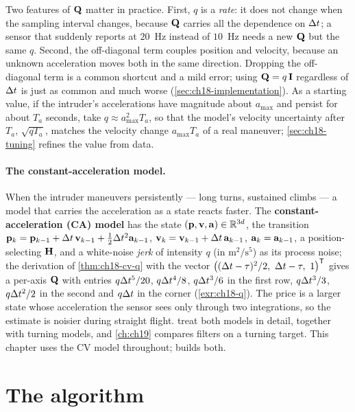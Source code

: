 Two features of $\mathbf{Q}$ matter in practice. First, $q$ is a \emph{rate}: it
does not change when the sampling interval changes, because $\mathbf{Q}$ carries
all the dependence on $\Delta t$; a sensor that suddenly reports at $20$~Hz
instead of $10$~Hz needs a new $\mathbf{Q}$ but the same $q$. Second, the
off-diagonal term couples position and velocity, because an unknown
acceleration moves both in the same direction. Dropping the off-diagonal
term is a common shortcut and a mild error; using $\mathbf{Q}=q\,\mathbf{I}$
regardless of $\Delta t$ is just as common and much worse
(\cref{sec:ch18-implementation}). As a
starting value, if the intruder's accelerations have magnitude about
$a_{\max}$ and persist for about $T_a$ seconds, take $q\approx a_{\max}^2T_a$,
so that the model's velocity uncertainty after $T_a$, $\sqrt{qT_a}$, matches
the velocity change $a_{\max}T_a$ of a real maneuver; \cref{sec:ch18-tuning}
refines the value from data.

\paragraph{The constant-acceleration model.}
When the intruder maneuvers persistently --- long turns, sustained climbs
--- a model that carries the acceleration as a state reacts faster. The
\textbf{constant-acceleration (CA) model}
has the state $(\mathbf{p},\mathbf{v},\mathbf{a})\in\mathbb{R}^{3d}$, the transition
$\mathbf{p}_k=\mathbf{p}_{k-1}+\Delta t\,\mathbf{v}_{k-1}+\tfrac12\Delta t^2\mathbf{a}_{k-1}$,
$\mathbf{v}_k=\mathbf{v}_{k-1}+\Delta t\,\mathbf{a}_{k-1}$, $\mathbf{a}_k=\mathbf{a}_{k-1}$, a
position-selecting $\mathbf{H}$, and a white-noise \emph{jerk} of intensity $q$
(in $\mathrm{m^2/s^5}$) as its process noise; the derivation of
\cref{thm:ch18-cv-q} with the vector $\bigl((\Delta t-\tau)^2/2,\ \Delta t-\tau,\ 1\bigr)^{\mathsf{T}}$
gives a per-axis $\mathbf{Q}$ with entries $q\Delta t^5/20$, $q\Delta t^4/8$, $q\Delta t^3/6$
in the first row, $q\Delta t^3/3$, $q\Delta t^2/2$ in the second and $q\Delta t$ in the
corner (\cref{exr:ch18-q}). The price is a larger state whose acceleration
the sensor sees only through two integrations, so the estimate is noisier
during straight flight. \textcite{barshalom2001estimation} treat both models
in detail, together with turning models, and \cref{ch:ch19} compares filters
on a turning target. This chapter uses the CV model throughout;
 builds both.

\section{The algorithm}
\label{sec:ch18-algorithm}

